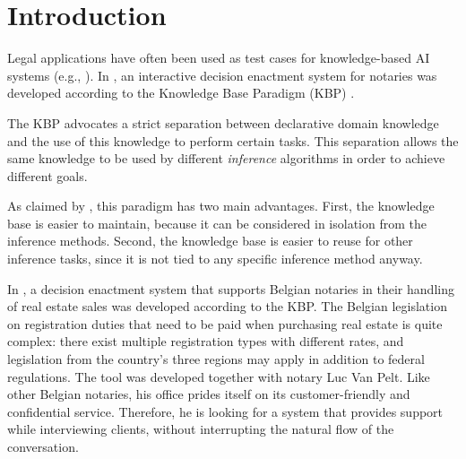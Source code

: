 \section{Introduction}

Legal applications have often been used as test cases for knowledge-based AI systems (e.g., \cite{cacm/SergotSKKHC86}). %
In \cite{ruleml/DeryckHVV18}, an interactive decision enactment system for notaries was developed according to the Knowledge Base Paradigm (KBP) \cite{iclp/DeneckerV08}. 

The KBP advocates a strict separation between declarative domain knowledge and the use of this knowledge to perform certain tasks. 
This separation allows the same knowledge to be used by different \emph{inference} algorithms in order to achieve different goals.
\begin{comment}
This is in contrast to  typical rule-based expert systems in which knowledge is formalized specifically with a forward-chaining inference algorithm in mind, or Prolog-based systems in which knowledge is formalized with a backwards query-answering algorithm in mind. 

In the KBP, domain knowledge is formalized as a purely declarative \emph{knowledge base}, which is not tied to a specific \emph{inference} method, allowing the same knowledge to be reused by different algorithms in order to achieve different goals.
\end{comment}
As claimed by \cite{iclp/DeneckerV08}, this paradigm has two main advantages. First, the knowledge base is easier to maintain, because it can be considered in isolation from the inference methods.  Second, the knowledge base is easier to reuse for other inference tasks, since it is not tied to any specific inference method anyway.

In \cite{ruleml/DeryckHVV18}, a decision enactment system that supports Belgian notaries in their handling of real estate sales was developed according to the KBP. The Belgian legislation on registration duties that need to be paid when purchasing real estate is quite complex: there exist multiple registration types with different rates, and legislation from the country's three regions may apply in addition to federal regulations. The tool was developed together with notary Luc Van Pelt. Like other Belgian notaries, his office prides itself on its customer-friendly and confidential service. Therefore, he is looking for a system that provides support while interviewing clients, without interrupting the natural flow of the conversation.%

